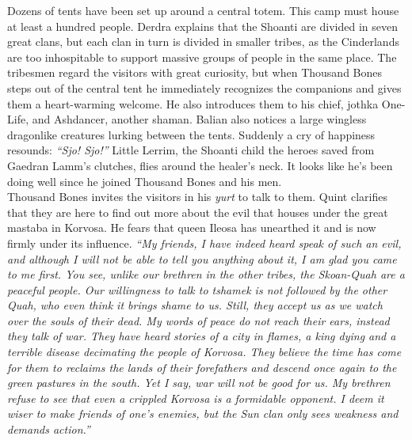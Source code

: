 Dozens of tents have been set up around a central totem. This camp must house at least a hundred people. Derdra explains that the Shoanti are divided in seven great clans, but each clan in turn is divided in smaller tribes, as the Cinderlands are too inhospitable to support massive groups of people in the same place. The tribesmen regard the visitors with great curiosity, but when Thousand Bones steps out of the central tent he immediately recognizes the companions and gives them a heart-warming welcome. He also introduces them to his chief, jothka One-Life, and Ashdancer, another shaman. Balian also notices a large wingless dragonlike creatures lurking between the tents. Suddenly a cry of happiness resounds: {\itshape``Sjo! Sjo!''} Little Lerrim, the Shoanti child the heroes saved from Gaedran Lamm's clutches, flies around the healer's neck. It looks like he's been doing well since he joined Thousand Bones and his men.\\

Thousand Bones invites the visitors in his {\itshape yurt} to talk to them. Quint clarifies that they are here to find out more about the evil that houses under the great mastaba in Korvosa. He fears that queen Ileosa has unearthed it and is now firmly under its influence. {\itshape``My friends, I have indeed heard speak of such an evil, and although I will not be able to tell you anything about it, I am glad you came to me first. You see, unlike our brethren in the other tribes, the Skoan-Quah are a peaceful people. Our willingness to talk to {\itshape tshamek} is not followed by the other Quah, who even think it brings shame to us. Still, they accept us as we watch over the souls of their dead. My words of peace do not reach their ears, instead they talk of war. They have heard stories of a city in flames, a king dying and a terrible disease decimating the people of Korvosa. They believe the time has come for them to reclaims the lands of their forefathers and descend once again to the green pastures in the south. Yet I say, war will not be good for us. My brethren refuse to see that even a crippled Korvosa is a formidable opponent. I deem it wiser to make friends of one's enemies, but the Sun clan only sees weakness and demands action.''}\\

